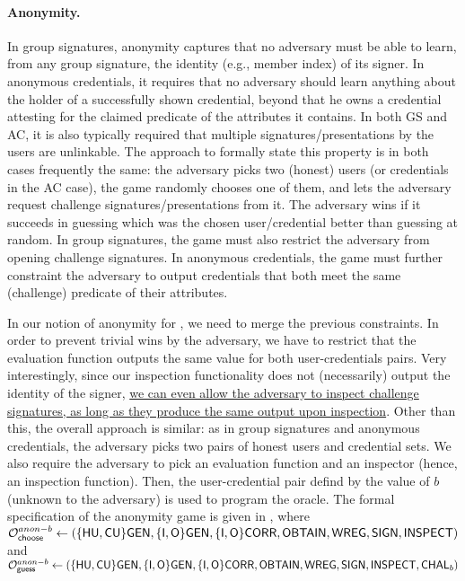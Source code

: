 \paragraph{Anonymity.} %
In group signatures, anonymity captures that no adversary must be able to learn,
from any group signature, the identity (e.g., member index) of its signer. In 
anonymous credentials, it requires that no adversary should learn anything about
the holder of a successfully shown credential, beyond that he owns a credential
attesting for the claimed predicate of the attributes it contains. In both GS
and AC, it is also typically required that
multiple signatures/presentations by the users are unlinkable. The approach to
formally state this property is in both cases frequently the same: the adversary
picks two (honest) users (or credentials in the AC case), the game randomly
chooses one of them, and lets the adversary request challenge
signatures/presentations from it. The adversary wins if it succeeds in guessing
which was the chosen user/credential better than guessing at random. In group
signatures, the game must also restrict the adversary from opening challenge
signatures. In anonymous credentials, the game must further constraint the
adversary to output credentials that both meet the same (challenge) predicate
of their attributes.

In our notion of anonymity for \UAS, we need to merge the previous constraints.
In order to prevent trivial wins by the adversary, we have to restrict that the
evaluation function outputs the same value for both user-credentials pairs. Very
interestingly, since our inspection functionality does not (necessarily) output
the identity of the signer, \uline{we can even allow the adversary to
  inspect challenge signatures, as long as they produce the same output upon
  inspection}. Other than this, the overall approach is similar: as in group
signatures and anonymous credentials, the adversary picks two pairs of honest
users and credential sets. We also require the adversary to pick an evaluation
function and an inspector (hence, an inspection function). Then, the
user-credential pair defind by the value of $b$ (unknown to the adversary) is
used to program the \CHALb oracle. The formal specification of the anonymity
game is given in , where $\mathcal{O}^{anon-b}_{\mathsf{choose}} \gets (\lbrace\mathsf{HU},
\mathsf{CU}\rbrace\mathsf{GEN},\lbrace\mathsf{I},\mathsf{O}\rbrace\mathsf{GEN},\lbrace\mathsf{I},\mathsf{O}\rbrace\mathsf{CORR},\mathsf{OBTAIN},
\mathsf{WREG},\mathsf{SIGN},\mathsf{INSPECT})$ and $\mathcal{O}^{anon-b}_{\mathsf{guess}} \gets (\lbrace\mathsf{HU},\mathsf{CU}\rbrace\mathsf{GEN},\lbrace\mathsf{I},
\mathsf{O}\rbrace\mathsf{GEN},\lbrace\mathsf{I},\mathsf{O}\rbrace\mathsf{CORR},\mathsf{OBTAIN},\mathsf{WREG},\mathsf{SIGN},\mathsf{INSPECT},\mathsf{CHAL}_b)$

